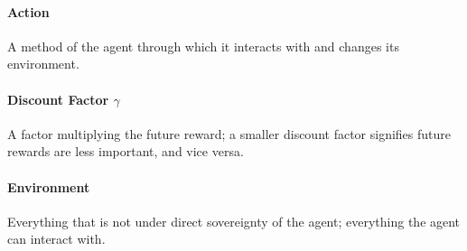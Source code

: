\documentclass[12pt]{article}
\begin{document}
\paragraph{Action} A method of the agent through which it interacts with and changes its environment.
\paragraph{Discount Factor $\gamma$} A factor multiplying the future reward; a smaller discount factor signifies future rewards are less important, and vice versa. 
\paragraph{Environment} Everything that is not under direct sovereignty of the agent; everything the agent can interact with. 
\end{document}
